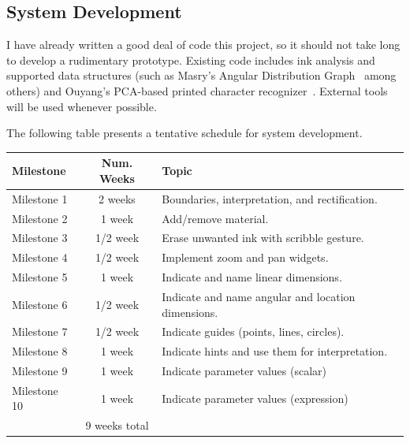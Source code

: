 \documentclass[12pt]{article}
\begin{document}
\subsection{System Development}
\label{sec:system-development-schedule}

I have already written a good deal of code this project, so it should
not take long to develop a rudimentary prototype. Existing code
includes ink analysis and supported data structures (such as Masry's
Angular Distribution Graph~\cite{masry-3d-sketch} among others) and
Ouyang's PCA-based printed character
recognizer~\cite{ouyang-visual-recog}. External tools will be used
whenever possible.

The following table presents a tentative schedule for system development.

\vspace{12pt}
\begin{tabular}{ | l | c | l | }
  \hline

  \textbf{Milestone} & \textbf{Num. Weeks} & \textbf{Topic} \\

  \hline \hline

  Milestone 1 & 2 weeks & Boundaries, interpretation, and rectification. \\
  
  Milestone 2 & 1 week & Add/remove material. \\

  Milestone 3 & 1/2 week & Erase unwanted ink with scribble gesture. \\

  Milestone 4 & 1/2 week & Implement zoom and pan widgets. \\ 

  Milestone 5 & 1 week & Indicate and name linear dimensions. \\

  Milestone 6 & 1/2 week & Indicate and name angular and location dimensions. \\

  Milestone 7 & 1/2 week & Indicate guides (points, lines, circles). \\ 

  Milestone 8 & 1 week & Indicate hints and use them for interpretation. \\ 

  Milestone 9 & 1 week & Indicate parameter values (scalar) \\ 

  Milestone 10 & 1 week & Indicate parameter values (expression) \\

  \hline
  
  & 9 weeks total & \\

  \hline

\end{tabular}
\vspace{12pt}
\end{document}
